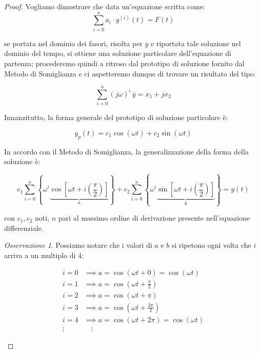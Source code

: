 \documentclass[11pt,italian]{article}
\theoremstyle{remark}
\newtheorem*{mdproposition}{Osservazione}
\newenvironment{remark}%
	{\begin{mdframed}[backgroundcolor=White]\begin{mdproposition}}%
	{\end{mdproposition}\end{mdframed}}
\begin{document}
\begin{proof}
    Vogliamo dimostrare che data un'equazione scritta come:
    \[
        \sum_{i=0}^{n} a_i \cdot y^{(i)}(t) = F(t)
    \]

    se portata nel dominio dei fasori, risolta per $\overline{y}$ e riportata tale soluzione nel dominio del tempo, si ottiene una soluzione particolare dell'equazione di partenza; procederemo quindi a ritroso dal prototipo di soluzione fornito dal Metodo di Somiglianza e ci aspetteremo dunque di trovare un risultato del tipo:

    \begin{equation}
        \sum_{i=0}^n (j \omega)^i\, \overline{y} = x_1 + j x_2
    \end{equation}

    \vspace{1em}

    Innanzitutto, la forma generale del prototipo di soluzione particolare è:

    \[
        y_p(t) = c_1 \cos (\omega t) + c_2 \sin (\omega t)
    \]

    In accordo con il Metodo di Somiglianza, la generalizzazione della forma della soluzione è:

    \begin{equation}
        c_1 \sum_{i=0} ^ n \left\{ \omega^i \underbrace{\cos \left[ \omega t + i \left( \frac{\pi}{2} \right) \right]}_{a} \right\} + c_2 \sum_{i=0} ^ n \left\{ \omega^i \underbrace{\sin \left[ \omega t + i \left( \frac{\pi}{2} \right) \right]}_{b} \right\} = y(t)
    \end{equation}

    con \(c_1, c_2\) noti, \(n\) pari al massimo ordine di derivazione presente nell'equazione differenziale.


    \begin{remark}
        Possiamo notare che i valori di \(a\) e \(b\) si ripetono ogni volta che \(i\) arriva a un multiplo di \(4\):

        \begin{align*}
            i = 0  & \implies a = \cos (\omega t + 0) = \cos (\omega t)    \\
            i = 1  & \implies a = \cos (\omega t + \frac{\pi}{2})          \\
            i = 2  & \implies a = \cos (\omega t + \pi)                    \\
            i = 3  & \implies a = \cos (\omega t + \frac{3\pi}{2})         \\
            i = 4  & \implies a = \cos (\omega t + 2\pi) = \cos (\omega t) \\
            \vdots & \quad \vdots
        \end{align*}


\end{remark}
\end{proof}
\end{document}
